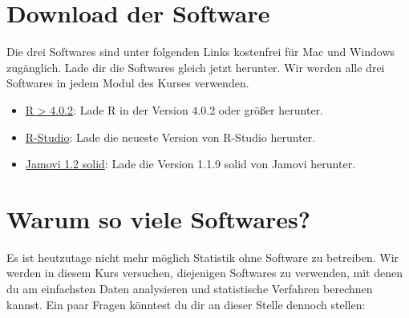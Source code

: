 \documentclass[
]{book}
\providecommand{\tightlist}{%
  \setlength{\itemsep}{0pt}\setlength{\parskip}{0pt}}
\begin{document}
\hypertarget{download-der-software}{%
\section{Download der Software}\label{download-der-software}}

Die drei Softwares sind unter folgenden Links kostenfrei für Mac und Windows zugänglich. Lade dir die Softwares gleich jetzt herunter. Wir werden alle drei Softwares in jedem Modul des Kurses verwenden.

\begin{itemize}
\tightlist
\item
  \href{https://ftp.gwdg.de/pub/misc/cran/}{R \textgreater{} 4.0.2}: Lade R in der Version 4.0.2 oder größer herunter.
\item
  \href{https://rstudio.com/products/rstudio/download/}{R-Studio}: Lade die neueste Version von R-Studio herunter.
\item
  \href{https://www.jamovi.org/download.html}{Jamovi 1.2 solid}: Lade die Version 1.1.9 solid von Jamovi herunter.
\end{itemize}

\hypertarget{warum-so-viele-softwares}{%
\section{Warum so viele Softwares?}\label{warum-so-viele-softwares}}

Es ist heutzutage nicht mehr möglich Statistik ohne Software zu betreiben. Wir werden in diesem Kurs versuchen, diejenigen Softwares zu verwenden, mit denen du am einfachsten Daten analysieren und statistische Verfahren berechnen kannst. Ein paar Fragen könntest du dir an dieser Stelle dennoch stellen:~
\end{document}
